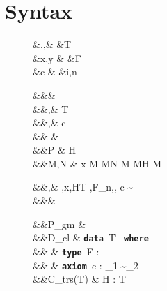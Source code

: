 \documentclass[screen,nonacm,manuscript,review]{acmart} %
\begin{document}
\section{Syntax}\label{sec:sfc-syntax}
\begin{figure}[ht]
 \centering
 \begin{syntax}
  &\TyVar,\beta,\Co &\qquad{} &T \\
  &x,y &\qquad{} &F\\
  &c &\qquad{} &i,n \in {}
 \end{syntax}
 \begin{syntax}
  &&\kappa \bnfeq& \star \bnfor \kappa \to \kappa \bnfor \shl{\sigma \sim \tau}\\
  &&\tau,\sigma \bnfeq& \TyVar \bnfor T \bnfor \tau \to \tau \bnfor \tau\App\tau \bnfor \Forall {\TyVar\co\kappa} \tau \bnfor {} \bnfor \shl{\Co}\\
  &&\nu,\Co \bnfeq& c \bnfor \Refl\tau \bnfor \Sym\Co \bnfor \Trans\nu\Co %
 \bnfor \Forall {\TyVar\co\kappa} \Co \bnfor \Co\At\tau %
 \bnfor \nu\App\Co \bnfor \Left \Co \bnfor \Right \Co\\  %
  && \phi \bnfeq& \tau \bnfor \Co\\
  &&P \bnfeq& H\App \many{\beta\co\kappa} \\
  &&M,N \bnfeq& x \bnfor {} M \bnfor M\App N \bnfor \TLam{\phi\co\kappa} M \bnfor M\App \tau \bnfor H \bnfor \Case M  \bnfor \shl{\Cast \Tm \Co}\\

 \end{syntax}
 \begin{syntax}
  &&\TEnv,\Delta \bnfeq& \empt \bnfor \TEnv,x\co\tau \bnfor \TEnv,H\co T \bnfor \TEnv,F_n\co\tau \bnfor \TEnv,\TyVar\co\kappa  \bnfor \TEnv, c \co \tau\sim\sigma\\
  &&\Subst \bnfeq& \empt \bnfor \Set{\many{\TyVar \mapsto \tau}}
 \end{syntax}

 \begin{syntax}
  &&P_{gm} \bnfeq&  \mathrel{;} \\
  &&D_{cl} \bnfeq& \textbf{\texttt{data }}\App T\co\many{\kappa} \to \star\App \textbf{\texttt{ where }}\App {} \\
 && \bnfor& \textbf{\texttt{type }}\App F : \many\kappa \to \kappa\\
 && \bnfor& \textbf{\texttt{axiom }}\App c\App \many{\TyVar\co\kappa} : \sigma_1 \sim \sigma_2\\
  &&C_{trs}(T) \bnfeq& H : \Forall {\many{\TyVar\co\kappa}} { \many\sigma \to T\many\TyVar}\\
 \end{syntax}


\end{figure}
\end{document}
